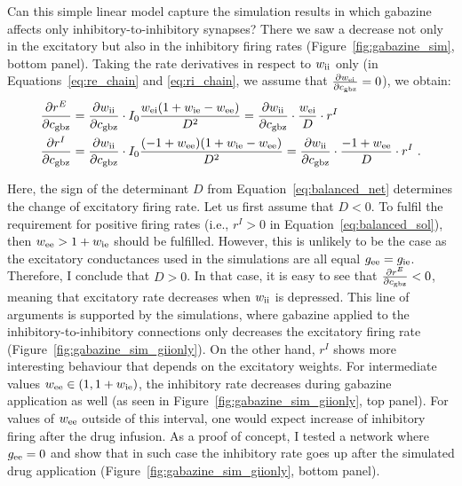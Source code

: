     Can this simple linear model capture the simulation results in which
    gabazine affects only inhibitory-to-inhibitory synapses? There we saw a
    decrease not only in the excitatory but also in the inhibitory firing rates
    (Figure~\ref{fig:gabazine_sim}, bottom panel). Taking the rate derivatives
    in respect to $w_{\rm ii}$ only (in Equations~\ref{eq:re_chain} and
    \ref{eq:ri_chain}, we assume that $\frac{\partial w_{\rm ei}}{\partial
    c_{\rm gbz}} = 0$), we obtain:
    \begin{equation}
      \begin{split}
        \frac{\partial r^E}{\partial c_{\rm gbz}} &=
            \frac{\partial w_{\rm ii}}{\partial c_{\rm gbz}} \cdot
            I_0 \frac{w_{\rm ei}(1 + w_{\rm ie} - w_{\rm ee})} {D^2} =
            \frac{\partial w_{\rm ii}}{\partial c_{\rm gbz}} \cdot \frac{w_{\rm ei}}{D} \cdot r^I \\
        \frac{\partial r^I}{\partial c_{\rm gbz}} &=
            \frac{\partial w_{\rm ii}}{\partial c_{\rm gbz}} \cdot
            I_0 \frac{(-1+w_{\rm ee}) (1 + w_{\rm ie} - w_{\rm ee})} {D^2} =
            \frac{\partial w_{\rm ii}}{\partial c_{\rm gbz}} \cdot \frac{-1+w_{\rm ee}}{D} \cdot r^I \,\, . \\
      \end{split}
    \end{equation}
 
    Here, the sign of the determinant $D$ from Equation~\ref{eq:balanced_net}
    determines the change of excitatory firing rate. Let us first assume that
    $D<0$. To fulfil the requirement for positive firing rates (i.e., $r^I>0$
    in Equation~\ref{eq:balanced_sol}), then $w_{\rm ee}>1+w_{\rm ie}$ should
    be fulfilled. However, this is unlikely to be the case as the excitatory
    conductances used in the simulations are all equal $g_{\rm ee}=g_{\rm ie}$.
    Therefore, I conclude that $D>0$. In that case, it is easy to see that
    $\frac{\partial r^E}{\partial c_{\rm gbz}} < 0$, meaning that excitatory
    rate decreases when $w_{\rm ii}$ is depressed. This line of arguments is
    supported by the simulations, where gabazine applied to the
    inhibitory-to-inhibitory connections only decreases the excitatory firing
    rate (Figure~\ref{fig:gabazine_sim_giionly}). On the other hand, $r^I$
    shows more interesting behaviour that depends on the excitatory weights.
    For intermediate values $w_{\rm ee} \in (1, 1+w_{\rm ie})$, the inhibitory
    rate decreases during gabazine application as well (as seen in
    Figure~\ref{fig:gabazine_sim_giionly}, top panel). For values of $w_{\rm
    ee}$ outside of this interval, one would expect increase of inhibitory
    firing after the drug infusion. As a proof of concept, I tested a
    network where $g_{\rm ee}= 0$ and show that in such case the inhibitory
    rate goes up after the simulated drug application
    (Figure~\ref{fig:gabazine_sim_giionly}, bottom panel).

